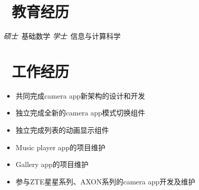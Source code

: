 \documentclass{resume}
\begin{document}


 
\section{\faGraduationCap\  教育经历}
\textit{硕士}\ 基础数学
\textit{学士}\ 信息与计算科学

\section{\faUsers\ 工作经历}
\begin{onehalfspacing}
\begin{itemize}
  \item 共同完成camera app新架构的设计和开发
  \item 独立完成全新的camera app模式切换组件
  \item 独立完成列表的动画显示组件
  \item Music player app的项目维护
  \item Gallery app的项目维护
  \item 参与ZTE星星系列、AXON系列的camera app开发及维护
\end{itemize}
\end{onehalfspacing}


\end{document}
